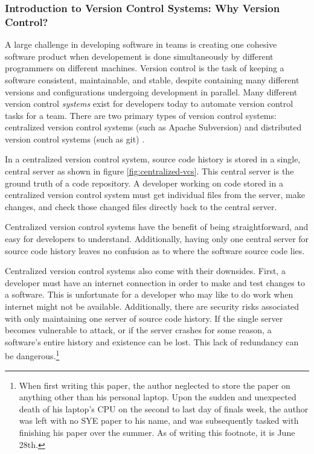 \documentclass{article}
\begin{document}
\subsubsection{Introduction to Version Control Systems: Why Version Control?}

A large challenge in developing software in teams is creating one cohesive software product when developement is done simultaneously by different programmers on different machines. Version control is the task of keeping a software consistent, maintainable, and stable, despite containing many different versions and configurations undergoing development in parallel. Many different version control \emph{systems} exist for developers today to automate version control tasks for a team. There are two primary types of version control systems: centralized version control systems (such as Apache Subversion) and distributed version control systems (such as git) \cite{Collins-SussmanFitzpatrickPilato_2004, ChaconStraub_2014}.

In a centralized version control system, source code history is stored in a single, central server as shown in figure \ref{fig:centralized-vcs}. This central server is the ground truth of a code repository. A developer working on code stored in a centralized version control system must get individual files from the server, make changes, and check those changed files directly back to the central server.

Centralized version control systems have the benefit of being straightforward, and easy for developers to understand. Additionally, having only one central server for source code history leaves no confusion as to where the software source code lies. 

Centralized version control systems also come with their downsides. First, a developer must have an internet connection in order to make and test changes to a software. This is unfortunate for a developer who may like to do work when internet might not be available. Additionally, there are security risks associated with only maintaining one server of source code history. If the single server becomes vulnerable to attack, or if the server crashes for some reason, a software's entire history and existence can be lost. This lack of redundancy can be dangerous.\footnote{When first writing this paper, the author neglected to store the paper on anything other than his personal laptop. Upon the sudden and unexpected death of his laptop's CPU on the second to last day of finals week, the author was left with no SYE paper to his name, and was subsequently tasked with finishing his paper over the summer. As of writing this footnote, it is June 28th.}
\end{document}
